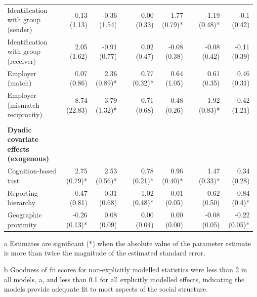 \begin{table}
{\begin{threeparttable}
\begin{tabular}{@{}lrrcrrcrr@{}}
Identification with group (sender) & 0.13 (1.13)\phantom{*} & -0.36 (1.54)\phantom{*} &  & 0.00 (0.33)\phantom{*} & 1.77 (0.79)* &  & -1.19 (0.48)* & -0.1 (0.42)\phantom{*} \\
Identification with group (receiver) & 2.05 (1.62)\phantom{*} & -0.91 (0.77)\phantom{*} &  & 0.02 (0.47)\phantom{*} & -0.08 (0.38)\phantom{*} &  & -0.08 (0.42)\phantom{*} & -0.11 (0.39)\phantom{*} \\
Employer (match) & 0.07 (0.86)\phantom{*} & 2.36 (0.89)* &  & 0.77 (0.32)* & 0.64 (1.05)\phantom{*} &  & 0.61 (0.35)\phantom{*} & 0.46 (0.31)\phantom{*} \\
Employer (mismatch reciprocity) & -8.74 (22.83)\phantom{*} & 3.79 (1.32)* &  & 0.71 (0.68)\phantom{*} & 0.48 (0.26)\phantom{*} &  & 1.92 (0.83)* & -0.42 (1.21)\phantom{*} \\ \\
\textbf{Dyadic covariate effects (exogenous)} & \multicolumn{1}{l}{} & \multicolumn{1}{l}{} &  & \multicolumn{1}{l}{} & \multicolumn{1}{l}{} &  & \multicolumn{1}{l}{} & \multicolumn{1}{l}{} \\
Cognition-based tust & 2.75 (0.79)* & 2.53 (0.56)* &  & 0.78 (0.21)* & 0.96 (0.40)* &  & 1.47 (0.33)* & 0.34 (0.28)\phantom{*} \\
Reporting hierarchy & 0.47 (0.81)\phantom{*} & 0.31 (0.68)\phantom{*} &  & -1.02 (0.48)* & -0.01 (0.05)\phantom{*} &  & 0.62 (0.50)\phantom{*} & 0.84 (0.4)* \\
Geographic proximity & -0.26 (0.13)* & 0.08 (0.09)\phantom{*} &  & 0.00 (0.04)\phantom{*} & 0.00 (0.00)\phantom{*} &  & -0.08 (0.05)\phantom{*} & -0.22 (0.05)* \\ \bottomrule
\end{tabular}

\begin{tablenotes}
\footnotesize
\item[a] Estimates are significant (*) when the absolute value of the parameter estimate is more than twice the magnitude of the estimated standard error.
\item[b] Goodness of fit scores for non-explicitly modelled statistics were less than 2 in all models, a, and less than 0.1 for all explicitly modelled effects, indicating the models provide adequate fit to most aspects of the social structure.

\end{tablenotes}

\end{threeparttable}
%
}
\end{table}

